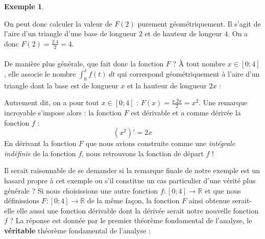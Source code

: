 \documentclass[a4paper,fontsize=13pt]{scrreprt}
\theoremstyle{plain}
\theoremstyle{definition}
\newtheorem{exe}[subsection]{Exemple}
\newcommand{\rr}{\mathbb{R}}
\newcommand {\grille}{\draw[help lines] (\xmin,\ymin) grid (\xmax,\ymax);}
\newcommand {\axes} {
	\draw[thick, ->] (\xmin,0) -- (\xmax+1,0);
	\draw[thick, ->] (0,\ymin) -- (0,\ymax+1);
	\draw (0,\ymax+0.5) node [left] {$y$};
	\draw (\xmax+0.5, 0) node [below] {$x$};
	\draw[thick] (-0.15,1)--(0.15,1) (1,-0.15)--(1,0.15);
	\draw (0,1)node[left]{$1$} (1,0)node[below]{$1$};
}
\begin{document}
\begin{exe}
\begin{center}
\end{center}
On peut donc calculer la valeur de $F(2)$ purement géométriquement. Il s'agit de l'aire d'un triangle d'une base de longueur $2$ et de hauteur de longeur $4$. On a donc $F(2) = \frac{2.4}{2} = 4$. \\
~\\
De manière plus générale, que fait donc la fonction $F$ ? À tout nombre $x \in [0;4]$, elle associe le nombre $\int_{0}^{x} f(t)~dt$ qui correspond géométriquement à l'aire d'un triangle dont la base est de longueur $x$ et la hauteur de longueur $2x$ :
\begin{center}
\end{center}
Autrement dit, on a pour tout $x \in [0;4]$ : $F(x) = \frac{x.2x}{2} = x^2$.
\newpage
Une remarque incroyable s'impose alors : la fonction $F$ est dérivable et a comme dérivée la fonction $f$ :
$$(x^2)' = 2x$$
En dérivant la fonction $F$ que nous avions construite comme une \emph{intégrale indéfinie} de la fonction $f$, nous retrouvons la fonction de départ $f$ !
\end{exe}
Il serait raisonnable de se demander si la remarque finale de notre exemple est un hasard propre à cet exemple ou s'il constitue un cas particulier d'une vérité plus générale ? Si nous choisissions une autre fonction $f : [0;4] \to \rr$ et que nous définissions $F : [0;4] \to \rr$ de la même façon, la fonction $F$ ainsi obtenue serait-elle elle aussi une fonction dérivable dont la dérivée serait notre nouvelle fonction $f$ ? La réponse est donnée par le premier théorème fondamental de l'analyse, le \textbf{véritable} théorème fondamental de l'analyse :
\end{document}
